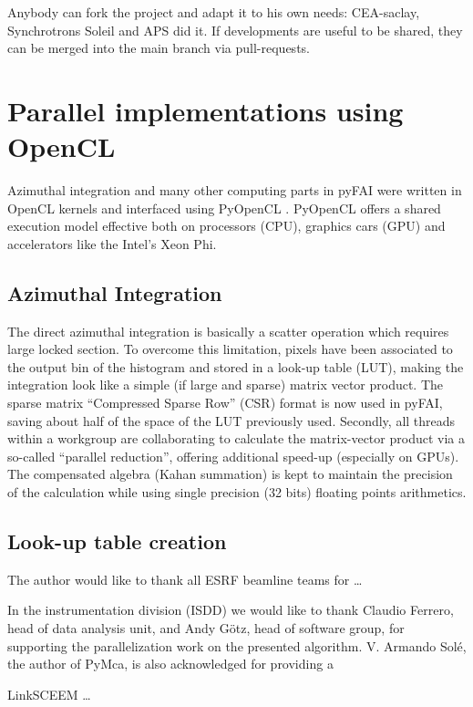 \documentclass[preprint]{iucr}
\begin{document}
Anybody can fork the project and adapt it to his own needs: CEA-saclay,
Synchrotrons Soleil and APS did it. If developments are useful to be shared,
they can be merged into the main branch via pull-requests.

\section{Parallel implementations using OpenCL}
Azimuthal integration and many other computing parts in pyFAI were written in
OpenCL kernels and interfaced using PyOpenCL \cite{pyopencl}. PyOpenCL offers a
shared execution model effective both on processors (CPU), graphics cars (GPU)
and accelerators like the Intel's Xeon Phi.

\subsection{Azimuthal Integration}
The direct azimuthal integration is basically a scatter operation which
requires large locked section.
To overcome this limitation, pixels have been
associated to the output bin of the histogram and stored in a look-up
table (LUT), making the integration look like a simple (if large and sparse)
matrix vector product.
The sparse matrix ``Compressed Sparse Row'' (CSR) format is now used in pyFAI,
saving about half of the space of the LUT previously used.
Secondly, all threads within a workgroup are collaborating to calculate the
matrix-vector product via a so-called ``parallel reduction'', offering
additional speed-up (especially on GPUs).
The compensated algebra (Kahan summation) is kept to maintain the precision
of the calculation while using single precision (32 bits) floating points
arithmetics.

\subsection{Look-up table creation}



The author would like to thank all ESRF beamline teams for \ldots

In the instrumentation division (ISDD) we would like to thank Claudio Ferrero,
head of data analysis unit, and Andy G\"otz, head of software group, for
supporting the parallelization work on the presented algorithm.
V. Armando Solé, the author of PyMca, is also acknowledged for providing a

LinkSCEEM \ldots
\end{document}
